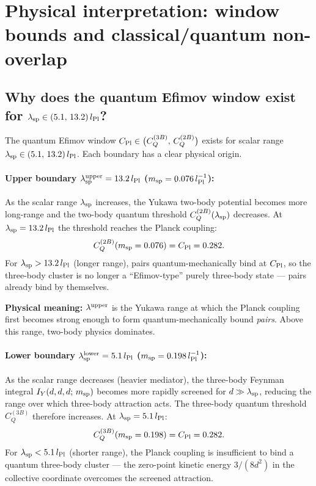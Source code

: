 \section{Physical interpretation: window bounds and classical/quantum non-overlap}
\label{sec:physical_interpretation}

\subsection{Why does the quantum Efimov window exist for
  \texorpdfstring{$\lambda_{\rm sp}\in(5.1,\,13.2)\,l_{\rm Pl}$}{lambda in (5.1,13.2) l\_Pl}?}
\label{sec:why_window}

The quantum Efimov window $C_{\rm Pl}\in\bigl(C_Q^{(3B)},\,C_Q^{(2B)}\bigr)$
exists for scalar range $\lambda_{\rm sp}\in(5.1,\,13.2)\,l_{\rm Pl}$.
Each boundary has a clear physical origin.

\paragraph{Upper boundary $\lambda_{\rm sp}^{\rm upper}=13.2\,l_{\rm Pl}$
  ($m_{\rm sp}=0.076\,l_{\rm Pl}^{-1}$):}
As the scalar range $\lambda_{\rm sp}$ increases, the Yukawa two-body
potential becomes more long-range and the two-body quantum threshold
$C_Q^{(2B)}(\lambda_{\rm sp})$ decreases.  At
$\lambda_{\rm sp}=13.2\,l_{\rm Pl}$ the threshold reaches the Planck
coupling:
\begin{equation}
  C_Q^{(2B)}(m_{\rm sp}=0.076) = C_{\rm Pl} = 0.282.
\end{equation}
For $\lambda_{\rm sp}>13.2\,l_{\rm Pl}$ (longer range), pairs
quantum-mechanically bind at $C_{\rm Pl}$, so the three-body cluster
is no longer a ``Efimov-type'' purely three-body state —
pairs already bind by themselves.

\textbf{Physical meaning:} $\lambda^{\rm upper}$ is the Yukawa range
at which the Planck coupling first becomes strong enough to form
quantum-mechanically bound \emph{pairs}.  Above this range, two-body
physics dominates.

\paragraph{Lower boundary $\lambda_{\rm sp}^{\rm lower}=5.1\,l_{\rm Pl}$
  ($m_{\rm sp}=0.198\,l_{\rm Pl}^{-1}$):}
As the scalar range decreases (heavier mediator), the three-body
Feynman integral $I_Y(d,d,d;\,m_{\rm sp})$ becomes more rapidly
screened for $d\gg\lambda_{\rm sp}$, reducing the range over which
three-body attraction acts.  The three-body quantum threshold
$C_Q^{(3B)}$ therefore increases.  At $\lambda_{\rm sp}=5.1\,l_{\rm Pl}$:
\begin{equation}
  C_Q^{(3B)}(m_{\rm sp}=0.198) = C_{\rm Pl} = 0.282.
\end{equation}
For $\lambda_{\rm sp}<5.1\,l_{\rm Pl}$ (shorter range), the Planck
coupling is insufficient to bind a quantum three-body cluster —
the zero-point kinetic energy $3/(8d^2)$ in the collective coordinate
overcomes the screened attraction.

